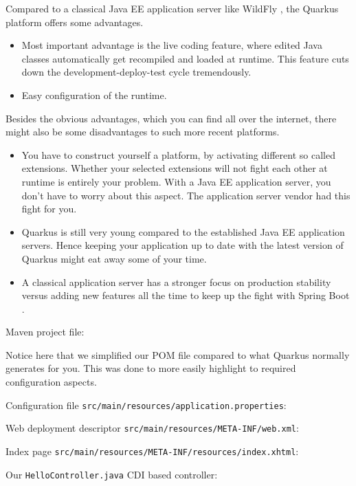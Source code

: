 Compared to a classical Java EE application server like WildFly \cite{WildFly}, the Quarkus \cite{quarkus} platform offers some advantages.
\begin{itemize}
	\item Most important advantage is the live coding feature, where edited Java classes automatically get recompiled and loaded at runtime.
	This feature cuts down the development-deploy-test cycle tremendously.
	\item Easy configuration of the runtime.
\end{itemize}
Besides the obvious advantages, which you can find all over the internet, there might also be some disadvantages to such more recent platforms.
\begin{itemize}
	\item You have to construct yourself a platform, by activating different so called extensions.
	Whether your selected extensions will not fight each other at runtime is entirely your problem.
	With a Java EE application server, you don't have to worry about this aspect.
	The application server vendor had this fight for you.
	\item Quarkus is still very young compared to the established Java EE application servers.
	Hence keeping your application up to date with the latest version of Quarkus might eat away some of your time.
	\item A classical application server has a stronger focus on production stability versus adding new features all the time to keep up the fight with Spring Boot \cite{spring}.
\end{itemize}

Maven project file:

Notice here that we simplified our POM file compared to what Quarkus normally generates for you.
This was done to more easily highlight to required configuration aspects.

Configuration file \texttt{src/main/resources/application.properties}:


Web deployment descriptor \texttt{src/main/resources/META-INF/web.xml}:


Index page \texttt{src/main/resources/META-INF/resources/index.xhtml}:


Our \texttt{HelloController.java} CDI based controller:


